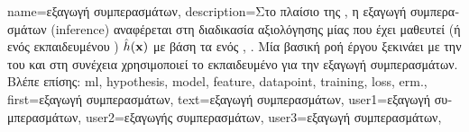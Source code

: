 {name={\foreignlanguage{greek}{εξαγωγή συμπερασμάτων}}, 
	description={\foreignlanguage{greek}{Στο πλαίσιο της} , \foreignlanguage{greek}{η εξαγωγή 
		συμπερασμάτων} (inference) 
		\foreignlanguage{greek}{αναφέρεται στη διαδικασία αξιολόγησης μίας} 
		 \foreignlanguage{greek}{που έχει μαθευτεί (ή ενός εκπαιδευμένου} 
		) $\hat{h}({\bf x})$ \foreignlanguage{greek}{με βάση τα}
		 \foreignlanguage{greek}{ενός}  \cite{BishopBook}, \cite{Murphy2012}. 
		\foreignlanguage{greek}{Μία βασική ροή έργου}  \foreignlanguage{greek}{ξεκινάει με την} 
		 \foreignlanguage{greek}{του}  \foreignlanguage{greek}{και στη συνέχεια 
		χρησιμοποιεί το εκπαιδευμένο}  \foreignlanguage{greek}{για την εξαγωγή συμπερασμάτων}. 
				\\
		\foreignlanguage{greek}{Βλέπε επίσης:} \gls{ml}, \gls{hypothesis}, \gls{model}, \gls{feature}, \gls{datapoint}, 
		\gls{training}, \gls{loss}, \gls{erm}.},
	first={\foreignlanguage{greek}{εξαγωγή συμπερασμάτων}},
	text={\foreignlanguage{greek}{εξαγωγή συμπερασμάτων}},
	user1={\foreignlanguage{greek}{εξαγωγή συμπερασμάτων}}, %
	user2={\foreignlanguage{greek}{εξαγωγής συμπερασμάτων}}, %
	user3={\foreignlanguage{greek}{εξαγωγή συμπερασμάτων}}, %
}%

